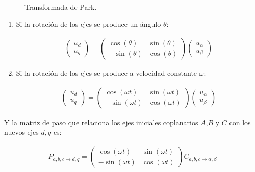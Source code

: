 \documentclass{report}
\begin{document}
\begin{figure}[!h]
\begin{center}
\end{center}
\caption{Transformada de Park.} \label{fig.transformadadepark}
\end{figure}

\begin{enumerate}
\item Si la rotación de los ejes se produce un ángulo $\theta$:

\begin{eqnarray}
\left(\begin{array}{cc}
u_{d}\\
u_{q}
\end{array}\right) =
\left( \begin{array}{cccc}
\cos(\theta) & \sin(\theta)\\
-\sin(\theta) & \cos(\theta)
\end{array} \right)
\left(\begin{array}{cc}
u_{\alpha}\\
u_{\beta}
\end{array}\right)  \label{eq.Pdqalfabeta_teta}
\end{eqnarray}

\item Si la rotación de los ejes se produce a velocidad constante $\omega$:

\begin{eqnarray}
\left(\begin{array}{cc}
u_{d}\\
u_{q}
\end{array}\right) =
\left( \begin{array}{cccc}
\cos(\omega t) & \sin(\omega t)\\
-\sin(\omega t) & \cos(\omega t)
\end{array} \right)
\left(\begin{array}{cc}
u_{\alpha}\\
u_{\beta}
\end{array}\right)   \label{eq.Pdqalfabeta_omega}
\end{eqnarray}

\end{enumerate}

Y la matriz de paso que relaciona los ejes iniciales coplanarios $A$,$B$ y $C$ con los nuevos ejes $d,q$ es:

\begin{eqnarray}
 P_{a,b,c\to d,q}=
\left( \begin{array}{cccc}
\cos(\omega t) & \sin(\omega t)\\
-\sin(\omega t) & \cos(\omega t)
\end{array} \right)
C_{a,b,c \to \alpha, \beta}\label{eq.PabcdqC}
\end{eqnarray}  
\end{document}
